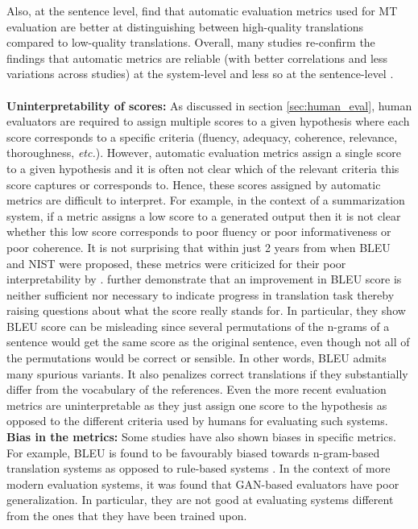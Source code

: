 Also, at the sentence level,  find that automatic evaluation metrics used for MT evaluation are better at distinguishing between high-quality translations compared to low-quality translations.
Overall, many studies   re-confirm the findings that automatic metrics are reliable (with better correlations and less variations across studies) 
at the system-level  and less so at the sentence-level . 
\\
\\
\textbf{Uninterpretability of scores: }
As discussed in section \ref{sec:human_eval}, human evaluators are required to assign multiple scores to a given hypothesis where each score corresponds to a specific criteria (fluency, adequacy, coherence, relevance, thoroughness, \textit{etc.}). However, automatic evaluation metrics assign a single score to a given hypothesis and it is often not clear which of the relevant criteria this score captures or corresponds to. Hence, these scores assigned by automatic metrics are difficult to interpret. For example, in the context of a summarization system, if a metric assigns a low score to a generated output then it is not clear whether this low score corresponds to poor fluency or poor informativeness or poor coherence.  
It is not surprising that within just 2 years from when BLEU and NIST were proposed, these metrics were criticized for their poor interpretability by . 
 further demonstrate that an improvement in BLEU score is neither sufficient nor necessary to indicate progress in translation task thereby raising questions about what the score really stands for. In particular, they show BLEU score can be misleading since several permutations of the n-grams of a sentence would get the same score as the original sentence, even though not all of the permutations would be correct or sensible. 
In other words, BLEU admits many spurious variants. It also penalizes correct translations if they substantially differ from the vocabulary of the references. Even the more recent evaluation metrics are uninterpretable as they just assign one score to the hypothesis as opposed to the different criteria used by humans for evaluating such systems.
~\\
\textbf{Bias in the metrics: }
Some studies have also shown biases in specific metrics. For example, BLEU is found to be favourably biased towards n-gram-based translation systems as opposed to rule-based systems .
In the context of more modern evaluation systems, it was found that GAN-based evaluators  have poor generalization. In particular, they are not good at evaluating systems different from the ones that they have been trained upon. 
